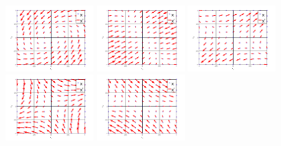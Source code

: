 \documentclass[12pt,a4paper]{article}
\begin{document}
    \includegraphics[width=0.25\textwidth]{A/19.png}
    \includegraphics[width=0.25\textwidth]{A/1.png}
    \includegraphics[width=0.25\textwidth]{A/5.png}
    \includegraphics[width=0.25\textwidth]{A/10.png}
    \includegraphics[width=0.25\textwidth]{A/18.png}
    
\end{document}
